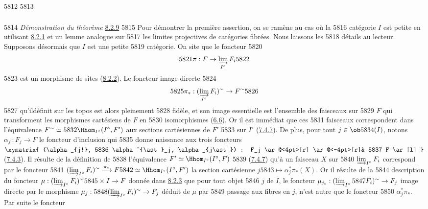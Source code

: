   5812	
  5813	\subsubsection{}
  5814	\emph{Démonstration du théorème} \hyperref[VI.thm8.2.9]{8.2.9}
  5815	Pour démontrer la première assertion, on se ramène au cas où la
  5816	catégorie $I$ est petite en utilisant \hyperref[VI.lem8.2.1]{8.2.1} et un lemme analogue sur
  5817	les limites projectives de catégories fibrées. Nous laissons les
  5818	détails au lecteur. Supposons désormais que $I$ est une petite
  5819	catégorie. On site que le foncteur
  5820	$$
  5821	\pi : F \to \varinjlim_{I^{\circ}} F_i
  5822	$$
  5823	est un morphisme de sites (\hyperref[VI.lem8.2.2]{8.2.2}). Le foncteur image directe
  5824	$$
  5825	\pi_{\ast} : (\varinjlim_{I^{\circ}} F_i)^{\sim} \to F^{\sim}
  5826	$$
  5827	qu'il\pageoriginale définit sur les topos est alors pleinement
  5828	fidèle, et son image essentielle est l'ensemble des faisceaux sur
  5829	$F$ qui transforment les morphismes cartésiens de $F$ en
  5830	isomorphismes (\hyperref[VI.exe6.6]{6.6}). Or il est immédiat que ces
  5831	faisceaux correspondent dans l'équivalence $F^{\sim} \simeq
  5832	\Hhom_{I^{\circ}}(I^{\circ}, F')$ aux sections cartésiennes de $F'$
  5833	sur $I^{\circ}$ (\hyperref[VI.prop7.4.7]{7.4.7}). De plus, pour tout $j \in \ob
  5834	(I)$, notons $\alpha_{j!} : F_j \to F$ le foncteur d'inclusion qui
  5835	donne naissance aux trois foncteurs $\xymatrix{ (\alpha_{j!},
  5836	\alpha^{\ast}_j, \alpha_{j\ast}) : F_j  \ar@<4pt>[r] \ar@<-4pt>[r]&
  5837	F \ar[l] }$ (\hyperref[VI.rem7.4.3]{7.4.3}). Il résulte de la définition de
  5838	l'équivalence $F' \simeq \Hhom_{I^{\circ}}(I^{\circ},F)$
  5839	(\hyperref[VI.prop7.4.7]{7.4.7}) qu'à un faisceau $X$  sur
  5840	$\varinjlim_{I^{\circ}} F_i$ correspond par le foncteur
  5841	$(\varinjlim_{I^{\circ}} F_i)^{\sim} \xrightarrow{\pi_{\ast}} F
  5842	\simeq \Hhom_{I^{\circ}} (I^{\circ}, F')$ la section cartésienne $j
  5843	\mapsto \alpha^{\ast}_{j} \pi_{\ast}(X)$. Or il résulte de la
  5844	description du foncteur $\mu : (\varinjlim_{I^{\circ}} F_i)^{\sim}
  5845	\times I \to F$ donnée dans \hyperref[VI.thm8.2.3]{8.2.3} que pour tout objet
  5846	$j$ de $I$, le foncteur $\mu_{j_\ast} : (\varinjlim_{I^{\circ}}
  5847	F_i)^{\sim} \to F_j$ image directe par le morphisme $\mu_j :
  5848	(\varinjlim_{I^{\circ}} F_i)^{\sim} \to F_j$ déduit de $\mu$ par
  5849	passage aux fibres en $j$, n'est autre que le foncteur
  5850	$\alpha^{\ast}_j \pi_{\ast}$. Par suite le foncteur
